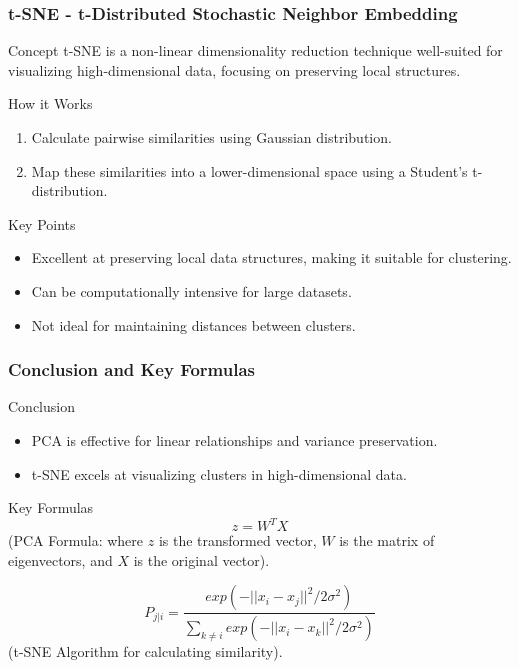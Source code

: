 \documentclass[aspectratio=169]{beamer}
\begin{document}
\begin{frame}[fragile]
    \frametitle{t-SNE - t-Distributed Stochastic Neighbor Embedding}
    \begin{block}{Concept}
        t-SNE is a non-linear dimensionality reduction technique well-suited for visualizing high-dimensional data, focusing on preserving local structures.
    \end{block}
    
    \begin{block}{How it Works}
        \begin{enumerate}
            \item Calculate pairwise similarities using Gaussian distribution.
            \item Map these similarities into a lower-dimensional space using a Student's t-distribution.
        \end{enumerate}
    \end{block}
    
    \begin{block}{Key Points}
        \begin{itemize}
            \item Excellent at preserving local data structures, making it suitable for clustering.
            \item Can be computationally intensive for large datasets.
            \item Not ideal for maintaining distances between clusters.
        \end{itemize}
    \end{block}
\end{frame}

\begin{frame}[fragile]
    \frametitle{Conclusion and Key Formulas}
    \begin{block}{Conclusion}
        \begin{itemize}
            \item PCA is effective for linear relationships and variance preservation.
            \item t-SNE excels at visualizing clusters in high-dimensional data.
        \end{itemize}
    \end{block}
    
    \begin{block}{Key Formulas}
        \begin{equation}
            z = W^TX
        \end{equation}
        (PCA Formula: where \( z \) is the transformed vector, \( W \) is the matrix of eigenvectors, and \( X \) is the original vector).
        
        \begin{equation}
            P_{j|i} = \frac{exp(-||x_i - x_j||^2/2\sigma^2)}{\sum_{k \neq i}exp(-||x_i - x_k||^2/2\sigma^2)}
        \end{equation}
        (t-SNE Algorithm for calculating similarity).
    \end{block}
\end{frame}
\end{document}
